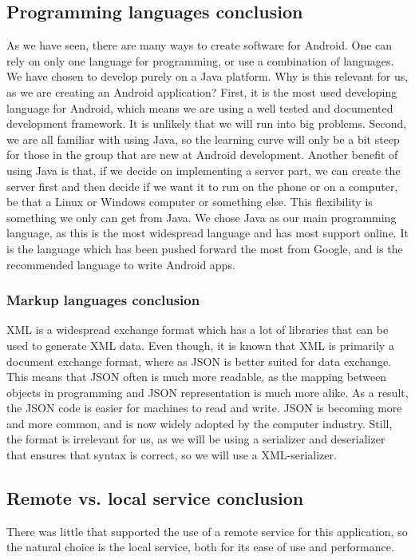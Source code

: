 \subsection{Programming languages conclusion}
As we have seen, there are many ways to create software for Android. One can rely on only one language for programming, or use a combination of languages. We have chosen to develop purely on a Java platform. Why is this relevant for us, as we are creating an Android application?
\newline
\newline
First, it is the most used developing language for Android, which means we are using a well tested and documented development framework. It is unlikely that we will run into big problems. Second, we are all familiar with using Java, so the learning curve will only be a bit steep for those in the group that are new at Android development.  Another benefit of using Java is that, if we decide on implementing a server part, we can create the server first and then decide if we want it to run on the phone or on a computer, be that a Linux or Windows computer or something else. This flexibility is something we only can get from Java.
\newline
\newline
We chose Java as our main programming language, as this is the most widespread language and has most support online. It is the language which has been pushed forward the most from Google, and is the recommended language to write Android apps.

\subsubsection{Markup languages conclusion}
XML is a widespread exchange format which has a lot of libraries that can be used to generate XML data. Even though, it is known that XML is primarily a document exchange format, where as JSON is better suited for data exchange. This means that JSON often is much more readable, as the mapping between objects in programming and JSON representation is much more alike. As a result, the JSON code is easier for machines to read and write. JSON is becoming more and more common, and is now widely adopted by the computer industry. Still, the format is irrelevant for us, as we will be using a serializer and deserializer that ensures that syntax is correct, so we will use a XML-serializer. 

\subsection{Remote vs. local service conclusion}
There was little that supported the use of a remote service for this application, so the natural choice is the local service, both for its ease of use and performance.

